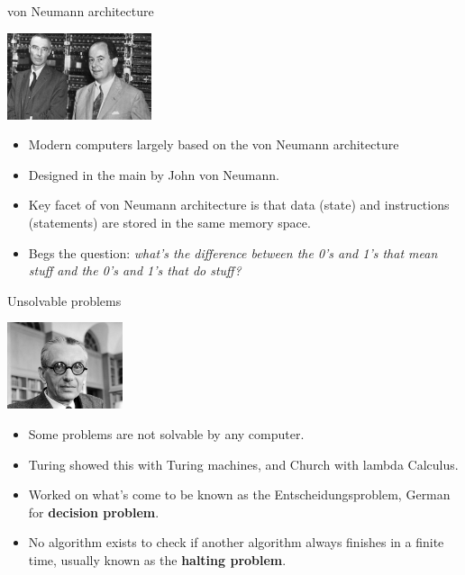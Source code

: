 \begin{frame}{von Neumann architecture}
  \begin{center}
    \includegraphics[height=1in]{img/vonneumann.jpg}
  \end{center}
  \begin{itemize}
    \item Modern computers largely based on the von Neumann architecture
    \item Designed in the main by John von Neumann.
    \item Key facet of von Neumann architecture is that data (state) and instructions (statements) are stored in the same memory space.
    \item Begs the question: \emph{what’s the difference between the 0’s and 1’s that mean stuff and the 0’s and 1’s that do stuff?}
  \end{itemize}
\end{frame}


\begin{frame}{Unsolvable problems}
  \begin{center}
    \includegraphics[height=1in]{img/godel.jpg}
  \end{center}
  \begin{itemize}
    \item Some problems are not solvable by any computer.
    \item Turing showed this with Turing machines, and Church with lambda Calculus.
    \item Worked on what’s come to be known as the Entscheidungsproblem, German for \textbf{decision problem}.
    \item No algorithm exists to check if another algorithm always finishes in a finite time, usually known as the \textbf{halting problem}.
  \end{itemize}
\end{frame}


